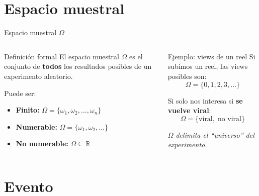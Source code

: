 \documentclass[aspectratio=169, 11pt]{beamer}
\begin{document}
\section{Espacio muestral}

\begin{frame}{Espacio muestral $\Omega$}
\begin{columns}[T]
\begin{block}{Definici\'on formal}
El \alert{espacio muestral} $\Omega$ es el conjunto de \textbf{todos} los resultados posibles de un experimento aleatorio.

\vspace{0.5em}
Puede ser:
\begin{itemize}
  \item \textbf{Finito:} $\Omega = \{\omega_1, \omega_2, \dots, \omega_n\}$
  \item \textbf{Numerable:} $\Omega = \{\omega_1, \omega_2, \dots\}$
  \item \textbf{No numerable:} $\Omega \subseteq \mathbb{R}$
\end{itemize}
\end{block}

\begin{exampleblock}{Ejemplo: views de un reel}
Si subimos un reel, las views posibles son:
\[
  \Omega = \{0, 1, 2, 3, \dots\}
\]

\vspace{0.3em}
Si solo nos interesa si \textbf{se vuelve viral}:
\[
  \Omega = \{\text{viral},\; \text{no viral}\}
\]

\vspace{0.3em}
\textit{$\Omega$ delimita el ``universo'' del experimento.}
\end{exampleblock}
\end{columns}
\end{frame}

\section{Evento}
\end{document}
